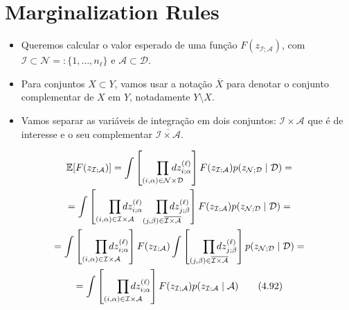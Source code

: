 \documentclass{beamer}
\newcommand{\EE}{\mathbb{E}}
\newcommand{\Dcal}{\mathcal{D}}
\newcommand{\Ical}{\mathcal{I}}
\newcommand{\Ncal}{\mathcal{N}}
\newcommand{\Acal}{\mathcal{A}}
\def\eell{{(\ell)}}
\begin{document}
\section{Marginalization Rules}

\begin{frame}
\tableofcontents[currentsection]
\end{frame}


\begin{frame}
	\begin{itemize}
		\item Queremos calcular o valor esperado de uma função $F(z_{\Ical;\Acal})$, com $\Ical\subset \Ncal =: \{1,\ldots,n_\ell\}$ e $\Acal\subset \Dcal$.
		\item Para conjuntos $X\subset Y$, vamos usar a notação $\overline{X}$ para denotar o conjunto complementar de $X$ em $Y$, notadamente $Y\setminus X$.
		\item Vamos separar as variáveis de integração em dois conjuntos: $\Ical\times\Acal$ que é de interesse e o seu complementar $\overline{\Ical\times\Acal}$.
	\end{itemize}
\end{frame}

\begin{frame}
	\begin{multline*}
		\EE[F(z_{\Ical;\Acal})] = \int\left[{\prod_{(i,\alpha)\in \Ncal\times\Dcal}}\hspace*{-12pt} dz_{i;\alpha}^\eell\right] F(z_{\Ical;\Acal}) p(z_{\Ncal;\Dcal}\mid \Dcal)= \\=
		\int\left[{\prod_{(i,\alpha)\in \Ical\times\Acal}}\hspace*{-12pt} dz_{i;\alpha}^\eell {\prod_{(j,\beta)\in \overline{\Ical\times\Acal}}} \hspace*{-12pt} dz_{j;\beta}^\eell\right] 
		F(z_{\Ical;\Acal}) p(z_{\Ncal;\Dcal}\mid \Dcal)= \\=
		\int\left[{\prod_{(i,\alpha)\in \Ical\times\Acal}} \hspace*{-12pt} dz_{i;\alpha}^\eell\right]F(z_{\Ical;\Acal})\int\left[ {\prod_{(j,\beta)\in \overline{\Ical\times\Acal}}} \hspace*{-12pt} dz_{j;\beta}^\eell\right] 
		 p(z_{\Ncal;\Dcal}\mid \Dcal)= \\
		 =\int\left[{\prod_{(i,\alpha)\in \Ical\times\Acal}}\hspace*{-12pt}  dz_{i;\alpha}^\eell\right]F(z_{\Ical;\Acal})p(z_{\Ical;\Acal}\mid \Acal)\tag{4.92}
	\end{multline*}
\end{frame}
\end{document}
